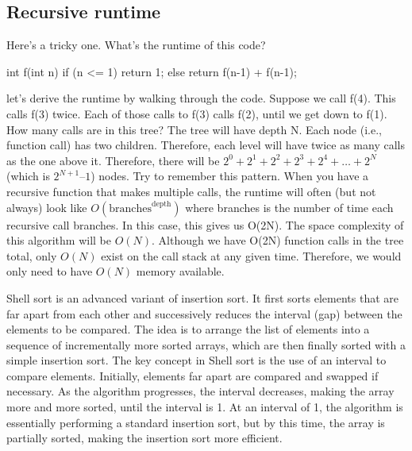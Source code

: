 \documentclass{report}
\begin{document}
    \subsection{Recursive runtime}
    \bigbreak \noindent 
    Here’s a tricky one. What’s the runtime of this code?
    \bigbreak \noindent 
    \begin{cppcode}
        int f(int n) {
            if (n <= 1) {
                return 1;
            } else {
                return f(n-1) + f(n-1);
            }
        }
            
    \end{cppcode}
    \bigbreak \noindent 
    let’s derive the runtime by walking through the code. Suppose we call f(4). This calls f(3) twice. Each of those calls to f(3) calls f(2), until we get down to f(1).
    \bigbreak \noindent 
    \bigbreak \noindent 
    How many calls are in this tree?
    \bigbreak \noindent 
    The tree will have depth N. Each node (i.e., function call) has two children. Therefore, each level will have twice as many calls as the one above it.
    \bigbreak \noindent 
    Therefore, there will be $2^{0} + 2^{1} + 2^{2} + 2^{3} + 2^{4} + \ldots + 2^{N}$ (which is $2^{N+1} – 1$) nodes.
    \bigbreak \noindent 
    Try to remember this pattern. When you have a recursive function that makes multiple calls, the runtime will often (but not always) look like $O(\text{branches}^{\text{depth}}) $ where branches is the number of time each recursive call branches. In this case, this gives us O(2N).
    \bigbreak \noindent 
    The space complexity of this algorithm will be $O(N)$. Although we have O(2N) function calls in the tree total, only $O(N)$ exist on the call stack at any given time. Therefore, we would only need to have $O(N)$ memory available.

    \pagebreak 
    \bigbreak \noindent 
    \begin{concept}
        Shell sort is an advanced variant of insertion sort. It first sorts elements that are far apart from each other and successively reduces the interval (gap) between the elements to be compared. The idea is to arrange the list of elements into a sequence of incrementally more sorted arrays, which are then finally sorted with a simple insertion sort.
        \bigbreak \noindent 
        The key concept in Shell sort is the use of an interval to compare elements. Initially, elements far apart are compared and swapped if necessary. As the algorithm progresses, the interval decreases, making the array more and more sorted, until the interval is 1. At an interval of 1, the algorithm is essentially performing a standard insertion sort, but by this time, the array is partially sorted, making the insertion sort more efficient.
    \end{concept}
    \bigbreak \noindent 
\end{document}
